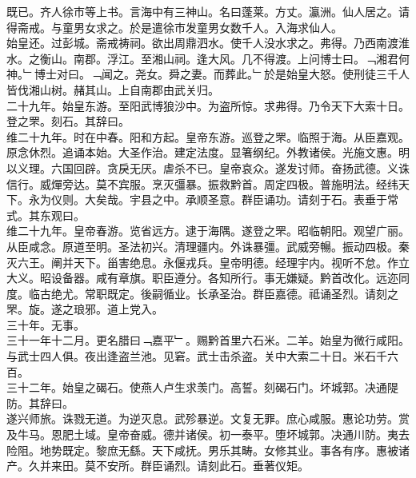 \documentclass{zhvt-classic}
\begin{document}
\hspace*{2em}既已。齐人徐巿等上书。言海中有三神山。名曰蓬莱。方丈。瀛洲。仙人居之。请得斋戒。与童男女求之。於是遣徐巿发童男女数千人。入海求仙人。\\
\hspace*{2em}始皇还。过彭城。斋戒祷祠。欲出周鼎泗水。使千人没水求之。弗得。乃西南渡淮水。之衡山。南郡。浮江。至湘山祠。逢大风。几不得渡。上问博士曰。﹁湘君何神。﹂博士对曰。﹁闻之。尧女。舜之妻。而葬此。﹂於是始皇大怒。使刑徒三千人皆伐湘山树。赭其山。上自南郡由武关归。\\
\hspace*{2em}二十九年。始皇东游。至阳武博狼沙中。为盗所惊。求弗得。乃令天下大索十日。\\
\hspace*{2em}登之罘。刻石。其辞曰。\\
\hspace*{2em}维二十九年。时在中春。阳和方起。皇帝东游。巡登之罘。临照于海。从臣嘉观。原念休烈。追诵本始。大圣作治。建定法度。显箸纲纪。外教诸侯。光施文惠。明以义理。六国回辟。贪戾无厌。虐杀不已。皇帝哀众。遂发讨师。奋扬武德。义诛信行。威燀旁达。莫不宾服。烹灭彊暴。振救黔首。周定四极。普施明法。经纬天下。永为仪则。大矣哉。宇县之中。承顺圣意。群臣诵功。请刻于石。表垂于常式。其东观曰。\\
\hspace*{2em}维二十九年。皇帝春游。览省远方。逮于海隅。遂登之罘。昭临朝阳。观望广丽。从臣咸念。原道至明。圣法初兴。清理疆内。外诛暴彊。武威旁暢。振动四极。秦灭六王。阐并天下。甾害绝息。永偃戎兵。皇帝明德。经理宇内。视听不怠。作立大义。昭设备器。咸有章旗。职臣遵分。各知所行。事无嫌疑。黔首改化。远迩同度。临古绝尤。常职既定。後嗣循业。长承圣治。群臣嘉德。祗诵圣烈。请刻之罘。旋。遂之琅邪。道上党入。\\
\hspace*{2em}三十年。无事。\\
\hspace*{2em}三十一年十二月。更名腊曰﹁嘉平﹂。赐黔首里六石米。二羊。始皇为微行咸阳。与武士四人俱。夜出逢盗兰池。见窘。武士击杀盗。关中大索二十日。米石千六百。\\
\hspace*{2em}三十二年。始皇之碣石。使燕人卢生求羡门。高誓。刻碣石门。坏城郭。决通隄防。其辞曰。\\
\hspace*{2em}遂兴师旅。诛戮无道。为逆灭息。武殄暴逆。文复无罪。庶心咸服。惠论功劳。赏及牛马。恩肥土域。皇帝奋威。德并诸侯。初一泰平。堕坏城郭。决通川防。夷去险阻。地势既定。黎庶无繇。天下咸抚。男乐其畴。女修其业。事各有序。惠被诸产。久并来田。莫不安所。群臣诵烈。请刻此石。垂著仪矩。\\
\end{document}
